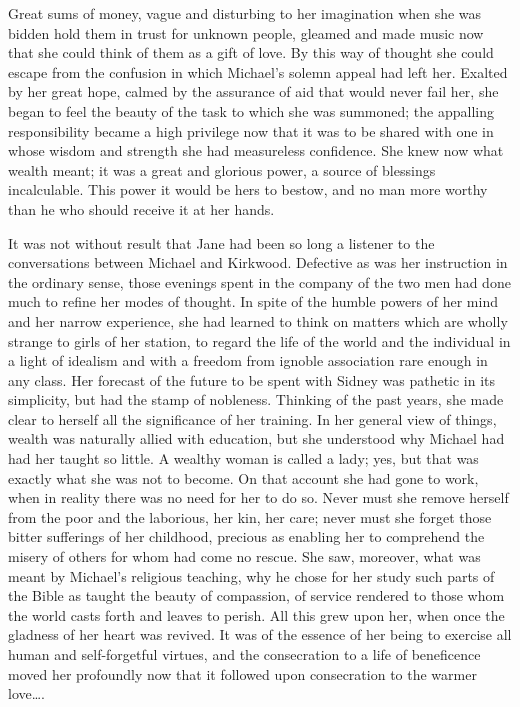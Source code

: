 Great sums of money, vague and disturbing to her imagination when she
was bidden hold them in trust for unknown people, gleamed and made music
now that she could think of them as a gift of love. By this way of
thought she could escape from the confusion in which Michael's solemn
appeal had left her. Exalted by her great hope, calmed by the assurance
of aid that would never fail her, she began to feel the beauty of the
task to which she was summoned; the appalling responsibility became a
high privilege now that it was to be shared with one in whose
{\protect\hypertarget{257}{}{}}wisdom and strength she had measureless
confidence. She knew now what wealth meant; it was a great and glorious
power, a source of blessings incalculable. This power it would be hers
to bestow, and no man more worthy than he who should receive it at her
hands.

It was not without result that Jane had been so long a listener to the
conversations between Michael and Kirkwood. Defective as was her
instruction in the ordinary sense, those evenings spent in the company
of the two men had done much to refine her modes of thought. In spite of
the humble powers of her mind and her narrow experience, she had learned
to think on matters which are wholly strange to girls of her station, to
regard the life of the world and the individual in a light of idealism
and with a freedom from ignoble association rare enough in any class.
Her forecast of the future to be spent with Sidney was pathetic in its
simplicity, but had the stamp of nobleness. Thinking of the past years,
she made clear to herself {\protect\hypertarget{258}{}{}}all the
significance of her training. In her general view of things, wealth was
naturally allied with education, but she understood why Michael had had
her taught so little. A wealthy woman is called a lady; yes, but that
was exactly what she was not to become. On that account she had gone to
work, when in reality there was no need for her to do so. Never must she
remove herself from the poor and the laborious, her kin, her care; never
must she forget those bitter sufferings of her childhood, precious as
enabling her to comprehend the misery of others for whom had come no
rescue. She saw, moreover, what was meant by Michael's religious
teaching, why he chose for her study such parts of the Bible as taught
the beauty of compassion, of service rendered to those whom the world
casts forth and leaves to perish. All this grew upon her, when once the
gladness of her heart was revived. It was of the essence of her being to
exercise all human and self-forgetful virtues, and the consecration to a
life of beneficence moved her profoundly now
{\protect\hypertarget{259}{}{}}that it followed upon consecration to the
warmer love\ldots{}.

